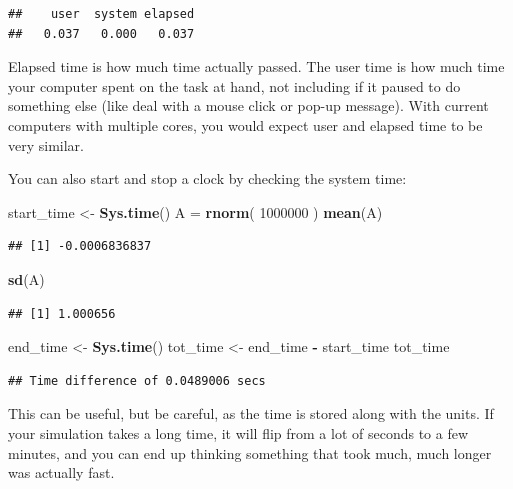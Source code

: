 \documentclass[
]{book}
\newenvironment{Shaded}{\begin{snugshade}}{\end{snugshade}}
\newcommand{\DecValTok}[1]{\textcolor[rgb]{0.00,0.00,0.81}{#1}}
\newcommand{\FunctionTok}[1]{\textcolor[rgb]{0.13,0.29,0.53}{\textbf{#1}}}
\newcommand{\NormalTok}[1]{#1}
\newcommand{\OtherTok}[1]{\textcolor[rgb]{0.56,0.35,0.01}{#1}}
\newcommand{\SpecialCharTok}[1]{\textcolor[rgb]{0.81,0.36,0.00}{\textbf{#1}}}
\begin{document}
\begin{verbatim}
##    user  system elapsed 
##   0.037   0.000   0.037
\end{verbatim}

Elapsed time is how much time actually passed.
The user time is how much time your computer spent on the task at hand, not including if it paused to do something else (like deal with a mouse click or pop-up message).
With current computers with multiple cores, you would expect user and elapsed time to be very similar.

You can also start and stop a clock by checking the system time:

\begin{Shaded}
\begin{Highlighting}[]
\NormalTok{start\_time }\OtherTok{\textless{}{-}} \FunctionTok{Sys.time}\NormalTok{()}
\NormalTok{A }\OtherTok{=} \FunctionTok{rnorm}\NormalTok{( }\DecValTok{1000000}\NormalTok{ )}
\FunctionTok{mean}\NormalTok{(A)}
\end{Highlighting}
\end{Shaded}

\begin{verbatim}
## [1] -0.0006836837
\end{verbatim}

\begin{Shaded}
\begin{Highlighting}[]
\FunctionTok{sd}\NormalTok{(A)}
\end{Highlighting}
\end{Shaded}

\begin{verbatim}
## [1] 1.000656
\end{verbatim}

\begin{Shaded}
\begin{Highlighting}[]
\NormalTok{end\_time }\OtherTok{\textless{}{-}} \FunctionTok{Sys.time}\NormalTok{()}
\NormalTok{tot\_time }\OtherTok{\textless{}{-}}\NormalTok{ end\_time }\SpecialCharTok{{-}}\NormalTok{ start\_time}
\NormalTok{tot\_time}
\end{Highlighting}
\end{Shaded}

\begin{verbatim}
## Time difference of 0.0489006 secs
\end{verbatim}

This can be useful, but be careful, as the time is stored along with the units. If your simulation takes a long time, it will flip from a lot of seconds to a few minutes, and you can end up thinking something that took much, much longer was actually fast.
\end{document}
